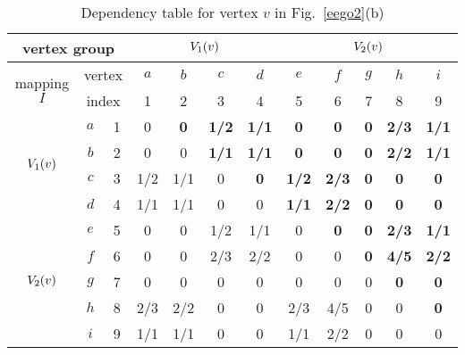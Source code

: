 \begin{table}
\caption{Dependency table for vertex $v$ in Fig.~\ref{eego2}(b)}\label{dependency_table}
\begin{center}
\resizebox{8.3cm}{!} {
\renewcommand{\arraystretch}{1.4}
\begin{tabular}{|c|c|c|@{}cccc@{}|@{}ccccc@{}|}
 \hline
 \hline
\multicolumn{3}{|c|}{vertex group} & \multicolumn{4}{|c|}{$\V{v}{1}$} & \multicolumn{5}{|c|}{$\V{v}{2}$} \\ 
\hline
\multirow{2}{*}{mapping $I$} &
\multicolumn{2}{|c|}{vertex} & $a$ & $b$ & $c$ & $d$ & $e$ & $f$ & $g$ & $h$ & $i$ \\ 
& \multicolumn{2}{|c|}{index} & 1 & 2 & 3 & 4 & 5 & 6 & 7 & 8 & 9 \\ 
\hline
\multirow{4}{*}{$\V{v}{1}$} & $a$ & 1 & 0 & \normalsize{\bf 0} & \normalsize{\bf 1/2} & \normalsize{\bf 1/1} & \normalsize{\bf 0} & \normalsize{\bf 0} & \normalsize{\bf 0} & \normalsize{\bf 2/3} & \normalsize{\bf 1/1} \\
& $b$ & 2 & 0 & 0 & \normalsize{\bf 1/1} & \normalsize{\bf 1/1} & \normalsize{\bf 0} & \normalsize{\bf 0} & \normalsize{\bf 0} & \normalsize{\bf 2/2} & \normalsize{\bf 1/1} \\
& $c$ & 3 & 1/2 & 1/1 & 0 & \normalsize{\bf 0} & \normalsize{\bf 1/2} & \normalsize{\bf 2/3} & \normalsize{\bf 0} & \normalsize{\bf 0} & \normalsize{\bf 0} \\
& $d$ & 4 & 1/1 & 1/1 & 0 & 0 & \normalsize{\bf 1/1} & \normalsize{\bf 2/2} & \normalsize{\bf 0} & \normalsize{\bf 0} & \normalsize{\bf 0} \\
 \hline
\multirow{5}{*}{$\V{v}{2}$} & $e$ & 5 & 0 & 0 & 1/2 & 1/1 & 0 & \normalsize{\bf 0} & \normalsize{\bf 0} & \normalsize{\bf 2/3} & \normalsize{\bf 1/1} \\
& $f$ & 6 & 0 & 0 & 2/3 & 2/2 & 0 & 0 & \normalsize{\bf 0} & \normalsize{\bf 4/5} & \normalsize{\bf 2/2} \\
& $g$ & 7 & 0 & 0 & 0 & 0 & 0 & 0 & 0 & \normalsize{\bf 0} & \normalsize{\bf 0} \\
& $h$ & 8 & 2/3 & 2/2 & 0 & 0 & 2/3 & 4/5 & 0 & 0 & \normalsize{\bf 0} \\
& $i$ & 9 & 1/1 & 1/1 & 0 & 0 & 1/1 & 2/2 & 0 & 0 & 0 \\
 \hline
 \hline         
\end{tabular}
}
\end{center}
\end{table}

